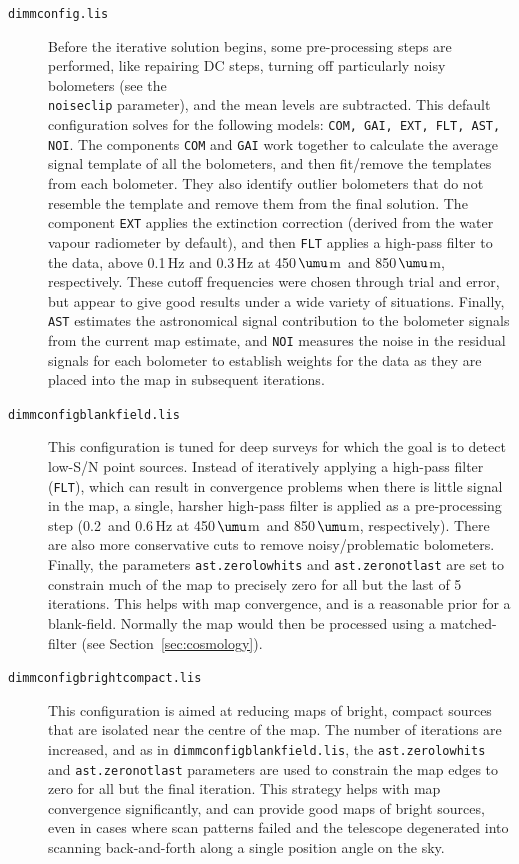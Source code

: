 \documentclass[twoside,11pt]{article}
\newcommand{\micron}{\mbox{\,${\umu}$m}}            %
\renewcommand{\_}{\texttt{\symbol{95}}}
\begin{document}
\begin{description}

\item[\texttt{dimmconfig.lis}]\quad Before the iterative solution
  begins, some pre-processing steps are performed, like repairing DC
  steps, turning off particularly noisy bolometers (see the
  \\ \texttt{noiseclip} parameter), and the mean levels are
  subtracted.  This default configuration solves for the following
  models: \texttt{COM, GAI, EXT, FLT, AST, NOI}. The components
  \texttt{COM} and \texttt{GAI} work together to calculate the average
  signal template of all the bolometers, and then fit/remove the
  templates from each bolometer. They also identify outlier bolometers
  that do not resemble the template and remove them from the final
  solution. The component \texttt{EXT} applies the extinction
  correction (derived from the water vapour radiometer by default),
  and then \texttt{FLT} applies a high-pass filter to the data, above
  0.1\,Hz and 0.3\,Hz at 450\micron\ and 850\micron,
  respectively. These cutoff frequencies were chosen through trial and
  error, but appear to give good results under a wide variety of
  situations. Finally, \texttt{AST} estimates the astronomical signal
  contribution to the bolometer signals from the current map estimate,
  and \texttt{NOI} measures the noise in the residual signals for each
  bolometer to establish weights for the data as they are placed into
  the map in subsequent iterations.

\item[\texttt{dimmconfig\_blank\_field.lis}]\quad This configuration
  is tuned for deep surveys for which the goal is to detect low-S/N
  point sources. Instead of iteratively applying a high-pass filter
  (\texttt{FLT}), which can result in convergence problems when there
  is little signal in the map, a single, harsher high-pass filter is
  applied as a pre-processing step (0.2\, and 0.6\,Hz at 450\micron\
  and 850\micron, respectively). There are also more conservative cuts
  to remove noisy/problematic bolometers. Finally, the parameters
  \texttt{ast.zero\_lowhits} and \texttt{ast.zero\_notlast} are set to
  constrain much of the map to precisely zero for all but the last of
  5 iterations. This helps with map convergence, and is a reasonable
  prior for a blank-field. Normally the map would then be processed
  using a matched-filter (see Section~\ref{sec:cosmology}).

\item[\texttt{dimmconfig\_bright\_compact.lis}]\quad This
  configuration is aimed at reducing maps of bright, compact sources
  that are isolated near the centre of the map. The number of
  iterations are increased, and as in
  \texttt{dimmconfig\_blank\_field.lis}, the
  \texttt{ast.zero\_lowhits} and \texttt{ast.zero\_notlast} parameters
  are used to constrain the map edges to zero for all but the final
  iteration. This strategy helps with map convergence significantly,
  and can provide good maps of bright sources, even in cases where
  scan patterns failed and the telescope degenerated into scanning
  back-and-forth along a single position angle on the sky.


\end{description}
\end{document}
